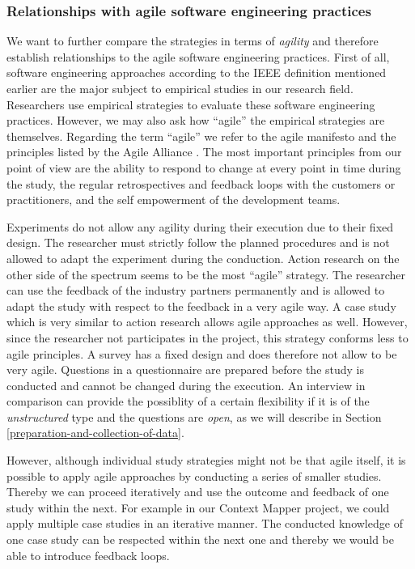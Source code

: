 \documentclass[runningheads]{llncs}
\begin{document}
\subsubsection{Relationships with agile software engineering practices}
We want to further compare the strategies in terms of \textit{agility} and therefore establish relationships to the agile software engineering practices. First of all, software engineering approaches according to the IEEE definition \cite{159342} mentioned earlier are the major subject to empirical studies in our research field. Researchers use empirical strategies to evaluate these software engineering practices. However, we may also ask how ``agile'' the empirical strategies are themselves. Regarding the term ``agile'' we refer to the agile manifesto and the principles listed by the Agile Alliance \cite{agile101}. The most important principles from our point of view are the ability to respond to change at every point in time during the study, the regular retrospectives and feedback loops with the customers or practitioners, and the self empowerment of the development teams. 

Experiments do not allow any agility during their execution due to their fixed design. The researcher must strictly follow the planned procedures and is not allowed to adapt the experiment during the conduction. Action research on the other side of the spectrum seems to be the most ``agile'' strategy. The researcher can use the feedback of the industry partners permanently and is allowed to adapt the study with respect to the feedback in a very agile way. A case study which is very similar to action research allows agile approaches as well. However, since the researcher not participates in the project, this strategy conforms less to agile principles. A survey has a fixed design and does therefore not allow to be very agile. Questions in a questionnaire are prepared before the study is conducted and cannot be changed during the execution. An interview in comparison can provide the possiblity of a certain flexibility if it is of the \textit{unstructured} type and the questions are \textit{open}, as we will describe in Section \ref{preparation-and-collection-of-data}.

However, although individual study strategies might not be that agile itself, it is possible to apply agile approaches by conducting a series of smaller studies. Thereby we can proceed iteratively and use the outcome and feedback of one study within the next. For example in our Context Mapper project, we could apply multiple case studies in an iterative manner. The conducted knowledge of one case study can be respected within the next one and thereby we would be able to introduce feedback loops.
\end{document}
